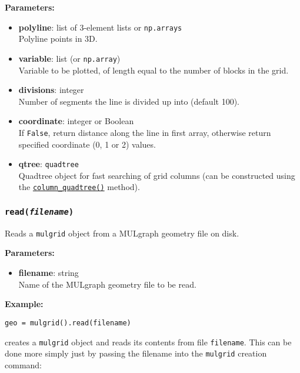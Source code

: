 
\textbf{Parameters:}
\begin{itemize}
\item \textbf{polyline}: list of 3-element lists or \texttt{np.arrays}\\
  Polyline points in 3D.
\item \textbf{variable}: list (or \texttt{np.array})\\
  Variable to be plotted, of length equal to the number of blocks in the grid.
\item \textbf{divisions}: integer\\
  Number of segments the line is divided up into (default 100).
\item \textbf{coordinate}: integer or Boolean\\
  If \texttt{False}, return distance along the line in first array, otherwise return specified coordinate (0, 1 or 2) values.
\item \textbf{qtree}: \texttt{quadtree}\\
  Quadtree object for fast searching of grid columns (can be constructed using the \hyperref[sec:mulgrid:column_quadtree]{\texttt{column\_quadtree()}} method).
\end{itemize}

\begin{snugshade}\subsubsection{\texttt{read(\emph{filename})}}\end{snugshade}
\label{sec:mulgrid:read}

Reads a \texttt{mulgrid} object from a MULgraph geometry file on disk.

\textbf{Parameters:}
\begin{itemize}
\item \textbf{filename}: string\\
  Name of the MULgraph geometry file to be read.
\end{itemize}

\textbf{Example:}

\begin{lstlisting}
geo = mulgrid().read(filename)
\end{lstlisting}

creates a \texttt{mulgrid} object and reads its contents from file \texttt{filename}.  This can be done more simply just by passing the filename into the \texttt{mulgrid} creation command:

